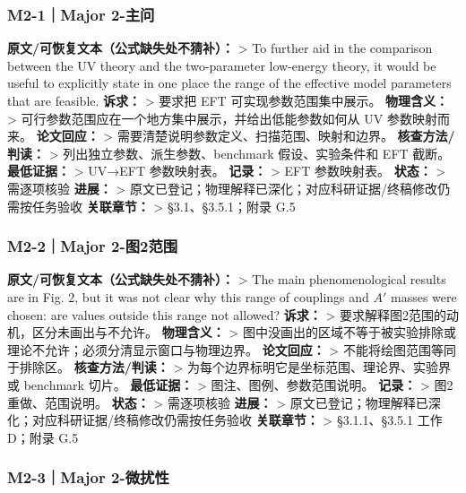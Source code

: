 \documentclass[
  chinese,
  UTF8]{ctexart}
\begin{document}
\subsubsection{M2-1｜Major 2-主问}\label{m2-1major-2-ux4e3bux95ee}

\textbf{原文/可恢复文本（公式缺失处不猜补）：} \textgreater{} To further
aid in the comparison between the UV theory and the two-parameter
low-energy theory, it would be useful to explicitly state in one place
the range of the effective model parameters that are feasible.
\textbf{诉求：} \textgreater{} 要求把 EFT 可实现参数范围集中展示。
\textbf{物理含义：} \textgreater{}
可行参数范围应在一个地方集中展示，并给出低能参数如何从 UV 参数映射而来。
\textbf{论文回应：} \textgreater{}
需要清楚说明参数定义、扫描范围、映射和边界。 \textbf{核查方法/判读：}
\textgreater{} 列出独立参数、派生参数、benchmark 假设、实验条件和 EFT
截断。 \textbf{最低证据：} \textgreater{} UV→EFT 参数映射表。
\textbf{记录：} \textgreater{} EFT 参数映射表。 \textbf{状态：}
\textgreater{} 需逐项核验 \textbf{进展：} \textgreater{}
原文已登记；物理解释已深化；对应科研证据/终稿修改仍需按任务验收
\textbf{关联章节：} \textgreater{} §3.1、§3.5.1；附录 G.5

\subsubsection{M2-2｜Major
2-图2范围}\label{m2-2major-2-ux56fe2ux8303ux56f4}

\textbf{原文/可恢复文本（公式缺失处不猜补）：} \textgreater{} The main
phenomenological results are in Fig. 2, but it was not clear why this
range of couplings and \(A'\) masses were chosen: are values outside
this range not allowed? \textbf{诉求：} \textgreater{}
要求解释图2范围的动机，区分未画出与不允许。 \textbf{物理含义：}
\textgreater{}
图中没画出的区域不等于被实验排除或理论不允许；必须分清显示窗口与物理边界。
\textbf{论文回应：} \textgreater{} 不能将绘图范围等同于排除区。
\textbf{核查方法/判读：} \textgreater{}
为每个边界标明它是坐标范围、理论界、实验界或 benchmark 切片。
\textbf{最低证据：} \textgreater{} 图注、图例、参数范围说明。
\textbf{记录：} \textgreater{} 图2重做、范围说明。 \textbf{状态：}
\textgreater{} 需逐项核验 \textbf{进展：} \textgreater{}
原文已登记；物理解释已深化；对应科研证据/终稿修改仍需按任务验收
\textbf{关联章节：} \textgreater{} §3.1.1、§3.5.1 工作 D；附录 G.5

\subsubsection{M2-3｜Major
2-微扰性}\label{m2-3major-2-ux5faeux6270ux6027}
\end{document}
